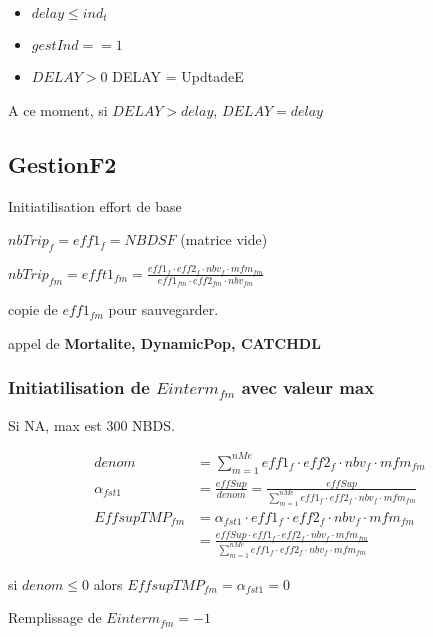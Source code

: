 \documentclass[12pt, colorinlistoftodos]{article}
\begin{document}
\begin{itemize}
    \item $delay \leq ind_t$ 
    \item $gestInd == 1$
    \item $DELAY > 0$ DELAY = UpdtadeE
\end{itemize}

A ce moment, si $DELAY > delay$, $DELAY = delay$

\newpage 

\subsection{GestionF2}

Initiatilisation effort de base

$nbTrip_f = eff1_f = NBDSF$ (matrice vide)

$ nbTrip_{fm} = efft1_{fm} = \frac{eff1_f \cdot eff2_f \cdot nbv_f \cdot mfm_{fm}}{eff1_{fm} \cdot eff2_{fm} \cdot nbv_{fm}}$

copie de $eff1_{fm}$ pour sauvegarder.

appel de \textbf{Mortalite, DynamicPop, CATCHDL}


\subsubsection{Initiatilisation de $Einterm_{fm}$ avec valeur max}

Si NA, max est 300 NBDS.

\begin{align}
    denom &= \sum_{m=1}^{nMe} eff1_f \cdot eff2_f \cdot nbv_f \cdot mfm_{fm} \\
    \alpha_{fst1} &= \frac{effSup}{denom} = \frac{effSup}{\sum_{m=1}^{nMe} eff1_f \cdot eff2_f \cdot nbv_f \cdot mfm_{fm}} \\
    EffsupTMP_{fm} &= \alpha_{fst1} \cdot eff1_f \cdot eff2_f \cdot nbv_f \cdot mfm_{fm} \\
    &=  \frac{ effSup\cdot eff1_f \cdot eff2_f \cdot nbv_f \cdot mfm_{fm}}{\sum_{m=1}^{nMe} eff1_f \cdot eff2_f \cdot nbv_f \cdot mfm_{fm}}
\end{align}

si $denom \leq 0$ alors $ EffsupTMP_{fm} = \alpha_{fst1} = 0 $

Remplissage de $Einterm_{fm} = -1$
\end{document}
